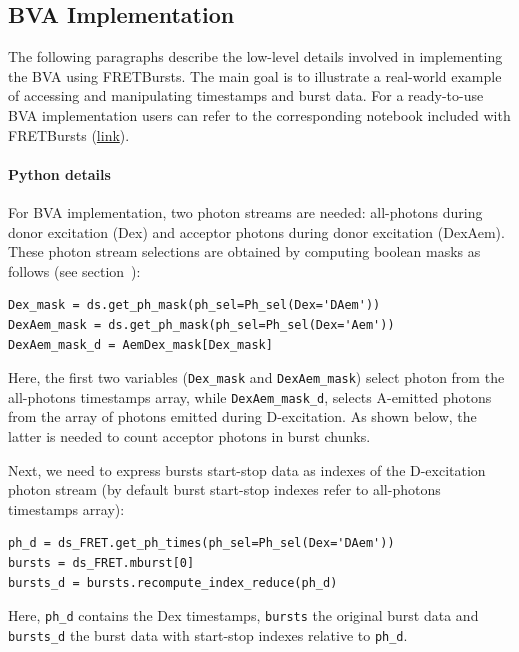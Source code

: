 \documentclass[10pt,letterpaper]{article}
\begin{document}
\subsection*{BVA Implementation}

The following paragraphs describe the low-level details involved in implementing the BVA using FRETBursts.
The main goal is to illustrate a real-world example of accessing and manipulating timestamps and burst data.
For a ready-to-use BVA implementation users can refer to the corresponding notebook included with FRETBursts
(\href{http://nbviewer.jupyter.org/github/tritemio/FRETBursts_notebooks/blob/master/notebooks/Example%20-%20Burst%20Variance%20Analysis.ipynb}{link}).

\paragraph*{Python details}
For BVA implementation, two photon streams are needed: all-photons during donor excitation (Dex)
and acceptor photons during donor excitation (DexAem).
These photon stream selections are obtained by computing boolean masks as follows
(see section~):

\begin{lstlisting}
Dex_mask = ds.get_ph_mask(ph_sel=Ph_sel(Dex='DAem'))
DexAem_mask = ds.get_ph_mask(ph_sel=Ph_sel(Dex='Aem'))
DexAem_mask_d = AemDex_mask[Dex_mask]
\end{lstlisting}

Here, the first two variables (\verb|Dex_mask| and \verb|DexAem_mask|)
select photon from the all-photons timestamps array,
while \verb|DexAem_mask_d|, selects A-emitted photons from the
array of photons emitted during D-excitation. As shown below,
the latter is needed to count acceptor photons in burst chunks.

Next, we need to express bursts start-stop data as indexes of the D-excitation photon stream
(by default burst start-stop indexes refer to all-photons timestamps array):

\begin{lstlisting}
ph_d = ds_FRET.get_ph_times(ph_sel=Ph_sel(Dex='DAem'))
bursts = ds_FRET.mburst[0]
bursts_d = bursts.recompute_index_reduce(ph_d)
\end{lstlisting}

Here, \verb|ph_d| contains the Dex timestamps, \verb|bursts| the original burst data and
\verb|bursts_d| the burst data with start-stop indexes relative to \verb|ph_d|.
\end{document}
